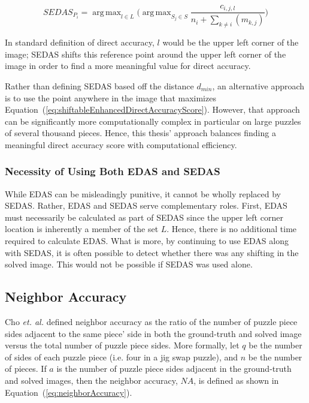 \documentclass{report}
\def\eref#1{(\ref{#1})}
\DeclareMathOperator*{\argmax}{arg\,max} %
\begin{document}
\begin{equation} \label{eq:shiftableEnhancedDirectAccuracyScore}
SEDAS_{P_i} = \argmax_{l \in L} \Big( \argmax_{S_j \in S}\frac{c_{i,j,l}}{n_i + \sum_{k \ne i}(m_{k,j})} \Big)
\end{equation}

\noindent
In standard definition of direct accuracy, $l$ would be the upper left corner of the image; SEDAS shifts this reference point around the upper left corner of the image in order to find a more meaningful value for direct accuracy. 

Rather than defining SEDAS based off the distance $d_{min}$, an alternative approach is to use the point anywhere in the image that maximizes Equation~\eref{eq:shiftableEnhancedDirectAccuracyScore}.  However, that approach can be significantly more computationally complex in particular on large puzzles of several thousand pieces.  Hence, this thesis' approach balances finding a meaningful direct accuracy score with computational efficiency.

\subsubsection{Necessity of Using Both EDAS and SEDAS}\label{sec:importanceEdasSedas}

While EDAS can be misleadingly punitive, it cannot be wholly replaced by SEDAS.  Rather, EDAS and SEDAS serve complementary roles.  First, EDAS must necessarily be calculated as part of SEDAS since the upper left corner location is inherently a member of the set $L$.  Hence, there is no additional time required to calculate EDAS.  What is more, by continuing to use EDAS along with SEDAS, it is often possible to detect whether there was any shifting in the solved image.  This would not be possible if SEDAS was used alone.

\subsection{Neighbor Accuracy}\label{sec:neighborAccuracy}

Cho \textit{et. al.} \cite{cho2010} defined neighbor accuracy as the ratio of the number of puzzle piece sides adjacent to the same piece' side in both the ground-truth and solved image versus the total number of puzzle piece sides.  More formally, let $q$ be the number of sides of each puzzle piece (i.e. four in a jig swap puzzle), and $n$ be the number of pieces.  If $a$ is the number of puzzle piece sides adjacent in the ground-truth and solved images, then the neighbor accuracy, $NA$, is defined as shown in Equation~\eref{eq:neighborAccuracy}.
\end{document}
